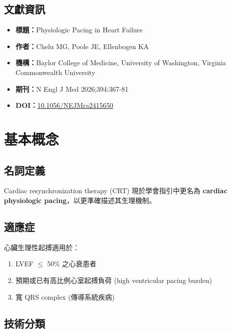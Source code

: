 \documentclass[12pt,a4paper]{article}
\begin{document}
\subsection{文獻資訊}

\begin{itemize}
    \item \textbf{標題：}Physiologic Pacing in Heart Failure
    \item \textbf{作者：}Chelu MG, Poole JE, Ellenbogen KA
    \item \textbf{機構：}Baylor College of Medicine, University of Washington, Virginia Commonwealth University
    \item \textbf{期刊：}N Engl J Med 2026;394:367-81
    \item \textbf{DOI：}\href{https://doi.org/10.1056/NEJMra2415650}{10.1056/NEJMra2415650}
\end{itemize}

\section{基本概念}

\subsection{名詞定義}

Cardiac resynchronization therapy (CRT) 現於學會指引中更名為 \textbf{cardiac physiologic pacing}，以更準確描述其生理機制。

\subsection{適應症}

心臟生理性起搏適用於：
\begin{enumerate}
    \item LVEF $\leq$ 50\% 之心衰患者
    \item 預期或已有高比例心室起搏負荷 (high ventricular pacing burden)
    \item 寬 QRS complex (傳導系統疾病)
\end{enumerate}

\subsection{技術分類}
\end{document}
